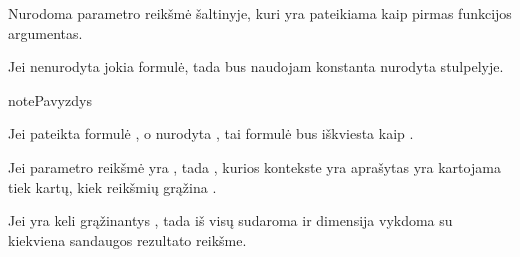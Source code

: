 \documentclass[letterpaper,10pt,lithuanian]{sphinxmanual}
\begin{document}

\begin{fulllineitems}
\label{\detokenize{dimensijos:param.source}}
\pysigstartsignatures
\pysigline
{}
\pysigstopsignatures
\sphinxAtStartPar
Nurodoma parametro reikšmė šaltinyje, kuri yra pateikiama kaip pirmas
{\hyperref[\detokenize{dimensijos:param.prepare}]{}} funkcijos argumentas.

\sphinxAtStartPar
Jei {\hyperref[\detokenize{dimensijos:param.prepare}]{}} nenurodyta jokia formulė, tada bus naudojam
konstanta nurodyta {\hyperref[\detokenize{dimensijos:param.source}]{}} stulpelyje.

\begin{sphinxadmonition}{note}{Pavyzdys}

\sphinxAtStartPar
Jei {\hyperref[\detokenize{dimensijos:param.prepare}]{}} pateikta formulė {\hyperref[\detokenize{dimensijos:param.read}]{}}, o
{\hyperref[\detokenize{dimensijos:param.source}]{}} nurodyta , tai formulė bus iškviesta kaip
.
\end{sphinxadmonition}

\end{fulllineitems}


\sphinxAtStartPar
Jei parametro reikšmė yra {\hyperref[\detokenize{savokos:term-iteratorius}]{}}, tada {\hyperref[\detokenize{savokos:term-dimensija}]{}}, kurios
kontekste yra aprašytas {\hyperref[\detokenize{dimensijos:param}]{}} yra kartojama tiek kartų,
kiek reikšmių grąžina {\hyperref[\detokenize{savokos:term-iteratorius}]{}}.

\sphinxAtStartPar
Jei yra keli {\hyperref[\detokenize{dimensijos:param}]{}} grąžinantys {\hyperref[\detokenize{savokos:term-iteratorius}]{}}, tada iš
visų {\hyperref[\detokenize{savokos:term-iteratorius}]{}} sudaroma  ir
{\hyperref[\detokenize{formatas:resource}]{}} dimensija vykdoma su kiekviena sandaugos rezultato reikšme.
\end{document}
